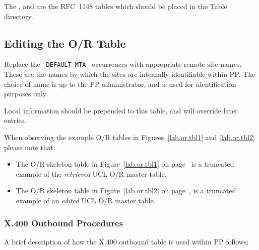 The ,  and  are the RFC~1148
tables which should be placed in the Table directory.

\subsection{Editing the O/R Table}

Replace the \verb|_DEFAULT_MTA_| occurrences with appropriate remote
site names. These are the names by which the sites are internally
identifiable within PP.  The choice of name is up to the PP
administrator, and is used for identification purposes only.

Local information should be prepended to this table, and will override
later entries.

When observing the example O/R tables in Figures~\ref{lab.or.tbl1}
and \ref{lab.or.tbl2} please note that:

\begin{itemize}
\item The O/R skeleton table in Figure~\ref{lab.or.tbl1} on
page~\pageref{lab.or.tbl1} is a truncated example of the {\em
retrieved} UCL O/R master table.

\item The O/R skeleton table in Figure~\ref{lab.or.tbl2} on
page~\pageref{lab.or.tbl2}, is a truncated example of an {\em edited}
UCL O/R master table.
\end{itemize}



\subsubsection{X.400 Outbound Procedures}

A brief description of how the X.400 outbound table is used within PP follows:

